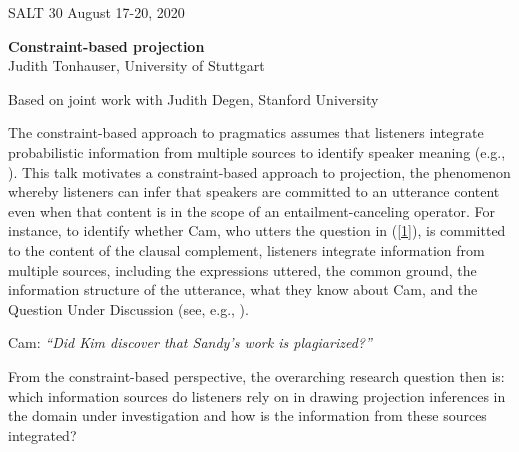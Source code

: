 \documentclass[12pt,fleqn]{article}
\newcommand{\6}{\mbox{$[\hspace*{-.6mm}[$}}
\newcommand{\9}{\mbox{$]\hspace*{-.6mm}]$}}
\begin{document}
 
SALT 30 \hfill August 17-20, 2020
  
\begin{center}
{\bf Constraint-based projection}
\\ Judith Tonhauser, University of Stuttgart
\end{center}

\vspace*{.5cm}

\noindent
Based on joint work with Judith Degen, Stanford University

\vspace*{.5cm}
\noindent
The constraint-based approach to pragmatics assumes that listeners integrate probabilistic information from multiple sources to identify speaker meaning (e.g., \citealt{degen-tanenhaus2019}). This talk motivates a constraint-based approach to projection, the phenomenon whereby listeners can infer that speakers are committed to an utterance content even when that content is in the scope of an entailment-canceling operator. For instance, to identify whether Cam, who utters the question in (\ref{1}), is committed to the content of the clausal complement, listeners integrate information from multiple sources, including the expressions uttered, the common ground, the information structure of the utterance, what they know about Cam, and the Question Under Discussion (see, e.g., \citealt{beaver-belly,brst-ar,cummins-rohde2015,djaerv-bacovcin-salt27,mahler2020,brst-salt10,best-question,tonhauser-salt26,tonhauser-guarani-variability,tbd-variability,tonhauser-etal-sub23}).

\begin{exe}
\ex\label{1} Cam: {\em ``Did Kim discover that Sandy's work is plagiarized?''}
\end{exe}

From the constraint-based perspective, the overarching research question then is: which information sources do listeners rely on in drawing projection inferences in the domain under investigation and how is the information from these sources integrated?
\end{document}
